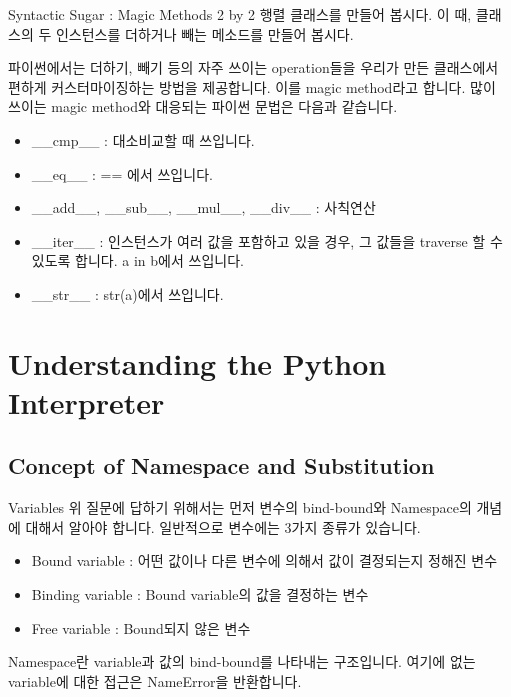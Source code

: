 \documentclass{beamer}
\begin{document}

\begin{frame}[fragile]{Syntactic Sugar : Magic Methods}
2 by 2 행렬 클래스를 만들어 봅시다. 이 때, 클래스의 두 인스턴스를 더하거나 빼는 메소드를 만들어 봅시다. 

파이썬에서는 더하기, 빼기 등의 자주 쓰이는 operation들을 우리가 만든 클래스에서 편하게 커스터마이징하는 방법을 제공합니다. 이를 magic method라고 합니다. 많이 쓰이는 magic method와 대응되는 파이썬 문법은 다음과 같습니다. 

\begin{itemize} 
\item \_\_cmp\_\_ : 대소비교할 때 쓰입니다. 
\item \_\_eq\_\_ : == 에서 쓰입니다.
\item \_\_add\_\_, \_\_sub\_\_, \_\_mul\_\_, \_\_div\_\_ : 사칙연산 
\item \_\_iter\_\_ : 인스턴스가 여러 값을 포함하고 있을 경우, 그 값들을 traverse 할 수 있도록 합니다. a in b에서 쓰입니다. 
\item \_\_str\_\_ : str(a)에서 쓰입니다.
\end{itemize}
\end{frame}

\section{Understanding the Python Interpreter}

\subsection{Concept of Namespace and Substitution} 

\begin{frame}[allowframebreaks]{Variables}
위 질문에 답하기 위해서는 먼저 변수의 bind-bound와 Namespace의 개념에 대해서 알아야 합니다. 일반적으로 변수에는 3가지 종류가 있습니다. 

\begin{itemize} 
\item Bound variable : 어떤 값이나 다른 변수에 의해서 값이 결정되는지 정해진 변수
\item Binding variable : Bound variable의 값을 결정하는 변수 
\item Free variable : Bound되지 않은 변수 
\end{itemize}

Namespace란 variable과 값의 bind-bound를 나타내는 구조입니다. 여기에 없는 variable에 대한 접근은 NameError을 반환합니다. 
\end{frame}
\end{document}

